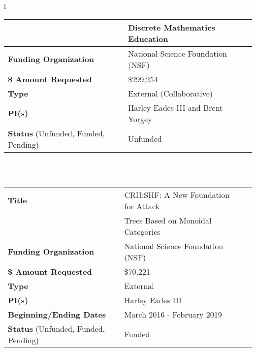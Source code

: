\documentclass[11pt]{article}
\begin{document}
\begin{tabular}{l}
\begin{tabular}{|l|l|l|}
          & Discrete Mathematics Education \\
          \hline
          \textbf{Funding Organization} & National Science Foundation (NSF)\\
          \hline
          \textbf{\$ Amount Requested} & \$299,254\\
          \hline
          \textbf{Type} & External (Collaborative)\\
          \hline
          \textbf{PI(s)} & Harley Eades III and Brent Yorgey\\
          \hline
          \textbf{Status} (Unfunded, Funded, Pending) & Unfunded\\
          \hline
        \end{tabular}\\
        \\
      \begin{tabular}{|l|l|l|}
          \hline
          \textbf{Title} & CRII:SHF: A New Foundation for Attack \,\,\,\,\,\,\,\,\,\,\,\,\,\\
          &  Trees Based on Monoidal  Categories\\
          \hline
          \textbf{Funding Organization} & National Science Foundation (NSF)\\
          \hline
          \textbf{\$ Amount Requested} & \$70,221\\
          \hline
          \textbf{Type} & External\\
          \hline
          \textbf{PI(s)} & Harley Eades III\\
          \hline
          \textbf{Beginning/Ending Dates} & March 2016 - February 2019\\
          \hline
          \textbf{Status} (Unfunded, Funded, Pending) & Funded\\
          \hline
        \end{tabular}
    \end{tabular}
\end{document}
